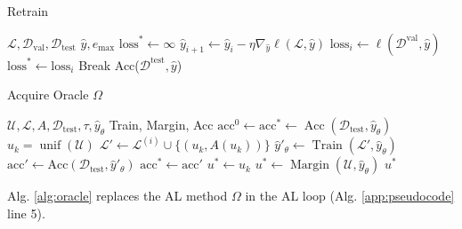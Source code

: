 \documentclass[]{article}
\newcommand{\D}{\mathcal{D}}
\newcommand{\U}{\mathcal{U}}
\newcommand{\LL}{\mathcal{L}}
\newcommand{\test}{\text{test}}
\begin{document}
\begin{algorithm}[H]
	\caption{Retrain}\label{alg:retrain}
	\begin{algorithmic}[1]
		\Require $\LL, \D_\text{val}, \D_\text{test}$
		\Require $\hat y, e_\text{max}$
		\State $\text{loss}^* \gets \infty$
		\State $\hat y_{i+1} \gets \hat y_i - \eta \nabla_{\hat y} \ell(\mathcal{L}, \hat y)$
		\State $\text{loss}_i \gets \ell(\mathcal{D}^\text{val}, \hat y)$
		\State $\text{loss}^* \gets \text{loss}_i$
		\Else
		\State Break
		\EndIf
		\EndFor
		\State
		\Return Acc($\mathcal{D}^\text{test}, \hat y$)
	\end{algorithmic}
\end{algorithm}

\begin{algorithm}[H]
	\caption{Acquire Oracle $\Omega$}\label{alg:oracle}
	\begin{algorithmic}[1]
		\Require $\mathcal{U}, \mathcal{L}, A, \mathcal{D}_\text{test}, \tau, \hat y_\theta$ 
		\Require Train, Margin, Acc
		\State $\text{acc}^0 \gets \text{acc}^* \gets \operatorname{Acc}(\mathcal{D}_\text{test}, \hat y_\theta)$ 
		\State $u_k = \operatorname{unif}(\U)$
		\State $\mathcal{L}' \gets \mathcal{L}^{(i)} \cup \{(u_k, A(u_k))\}$
		\State $\hat y'_\theta \gets \operatorname{Train}(\mathcal{L}', \hat y_\theta)$
		\State $\text{acc}' \gets \text{Acc}(\D_\test, \hat y'_\theta)$
		\State $\text{acc}^* \gets \text{acc}'$
		\State $u^* \gets u_k$
		\EndIf
		\EndFor
		\State $u^* \gets \operatorname{Margin}(\mathcal{U}, \hat y_\theta)$
		\EndIf
		\Return $u^*$
	\end{algorithmic}
\end{algorithm}
Alg. \ref{alg:oracle} replaces the AL method $\Omega$ in the AL loop (Alg. \ref{app:pseudocode} line 5). 
\end{document}
